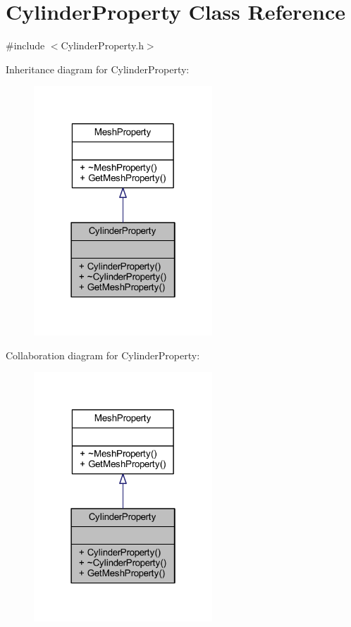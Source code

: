 \hypertarget{class_cylinder_property}{}\section{Cylinder\+Property Class Reference}
\label{class_cylinder_property}


{\ttfamily \#include $<$Cylinder\+Property.\+h$>$}



Inheritance diagram for Cylinder\+Property\+:
\nopagebreak
\begin{figure}[H]
\begin{center}
\leavevmode
\includegraphics[width=190pt]{class_cylinder_property__inherit__graph}
\end{center}
\end{figure}


Collaboration diagram for Cylinder\+Property\+:
\nopagebreak
\begin{figure}[H]
\begin{center}
\leavevmode
\includegraphics[width=190pt]{class_cylinder_property__coll__graph}
\end{center}
\end{figure}

